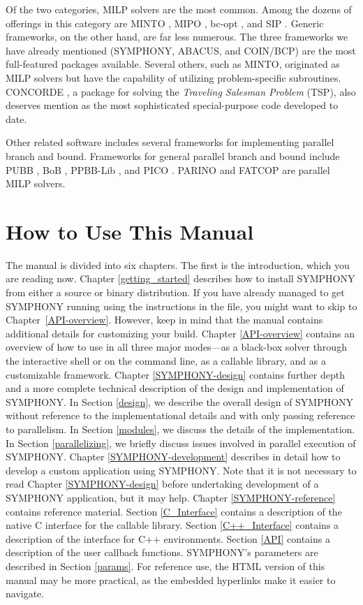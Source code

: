 Of the two categories, MILP solvers are the most common. Among the dozens of
offerings in this category are MINTO \cite{MINTO}, MIPO \cite{MIPO}, bc-opt
\cite{bc-opt}, and SIP \cite{SIP}. Generic frameworks, on the other hand, are
far less numerous. The three frameworks we have already mentioned (SYMPHONY,
ABACUS, and COIN/BCP) are the most full-featured packages available. Several
others, such as MINTO, originated as MILP solvers but have the capability of
utilizing problem-specific subroutines. CONCORDE \cite{concorde, concorde2}, a
package for solving the {\em Traveling Salesman Problem} (TSP), also deserves
mention as the most sophisticated special-purpose code developed to date.

Other related software includes several frameworks for implementing parallel
branch and bound. Frameworks for general parallel branch and bound include
PUBB \cite{PUBB}, BoB \cite{BoB}, PPBB-Lib \cite{PPBB-Lib}, and PICO
\cite{PICO}. PARINO \cite{PARINO} and FATCOP \cite{chen:fatcop2} are parallel
MILP solvers.

\section{How to Use This Manual}

The manual is divided into six chapters. The first is the introduction, which
you are reading now. Chapter \ref{getting_started} describes how to install
SYMPHONY from either a source or binary distribution. If you have already
managed to get SYMPHONY running using the instructions in the 
file, you might want to skip to Chapter~\ref{API-overview}. However, keep in
mind that the manual contains additional details for customizing your build.
Chapter \ref{API-overview} contains an overview of how to use in all three
major modes---as a black-box solver through the interactive shell or on the
command line, as a callable library, and as a customizable framework. Chapter
\ref{SYMPHONY-design} contains further depth and a more complete technical
description of the design and implementation of SYMPHONY. In Section
\ref{design}, we describe the overall design of SYMPHONY without reference to
the implementational details and with only passing reference to parallelism.
In Section \ref{modules}, we discuss the details of the implementation. In
Section \ref{parallelizing}, we briefly discuss issues involved in parallel
execution of SYMPHONY. Chapter \ref{SYMPHONY-development} describes in detail
how to develop a custom application using SYMPHONY. Note that it is not
necessary to read Chapter \ref{SYMPHONY-design} before undertaking development
of a SYMPHONY application, but it may help. Chapter \ref{SYMPHONY-reference}
contains reference material. Section \ref{C_Interface} contains a description
of the native C interface for the callable library. Section
\ref{C++_Interface} contains a description of the interface for C++
environments. Section \ref{API} contains a description of the user callback
functions. SYMPHONY's parameters are described in Section \ref{params}. For
reference use, the HTML version of this manual may be more practical, as the
embedded hyperlinks make it easier to navigate.

